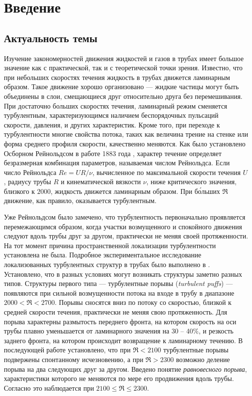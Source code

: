 \chapter{Введение}

\section{Актуальность темы} 

Изучение закономерностей движения жидкостей и газов в трубах имеет большое значение как с практической, так и с теоретической точки зрения. Известно, что при небольших скоростях течения жидкость в трубах движется ламинарным образом. Такое движение хорошо организовано --- жидкие частицы могут быть объединены в слои, смещающиеся друг относительно друга без перемешивания. При достаточно больших скоростях течения, ламинарный режим сменяется турбулентным, характеризующимся наличием беспорядочных пульсаций скорости, давления, и других характеристик. Кроме того, при переходе к турбулентности многие свойства потока, таких как величина трение на стенке или форма среднего профиля скорости, качественно меняются. Как было установлено Осборном Рейнольдсом в работе 1883 года \cite{Reynolds1883}, характер течение определяет безразмерная комбинация параметров, называемая числом Рейнольдса. Если число Рейнольдса $Re=UR/\nu$, вычисленное по максимальной скорости течения $U$, радиусу трубы $R$ и кинематической вязкости $\nu$, ниже критического значения, близкого к $2000$, жидкость движется ламинарным образом. При б\'{о}льших $\Re$ движение, как правило, оказывается турбулентным.

Уже Рейнольдсом было замечено, что турбулентность первоначально проявляется перемежающимся образом, когда участки возмущенного и спокойного движения следуют вдоль трубы друг за другом, практически не меняя своей протяженности. На тот момент причина пространственной локализации турбулентности установлена не была. Подробное экспериментальное исследование локализованных турбулентных структур в трубах было выполнено в \cite{Wygnanski1973}. Установлено, что в разных условиях могут возникать структуры заметно разных типов. Структуры первого типа --- турбулентные порывы ({\it turbulent puffs}) --- появляются при сильной возмущенности потока на входе в трубу в диапазоне $2000<\Re<2700$. Порывы сносятся вниз по потоку со скоростью, близкой к средней скорости течения, практически не меняя свою протяженность. Для порыва характерны размытость переднего фронта, на котором скорость на оси трубы плавно уменьшается от ламинарного значения на 30 -- 40\%, и резкость заднего фронта, на котором происходит возвращение к ламинарному течению. В последующей работе \cite{Wygnanski1975} установлено, что при $\Re<2100$ турбулентные порывы подвержены спонтанному исчезновению, а при $\Re>2300$ возможно деление порыва на два следующих друг за другом. Введено понятие {\it равновесного порыва}, характеристики которого не меняются по мере его продвижения вдоль трубы. Согласно \cite{Wygnanski1975} это наблюдается при $2100\leqslant\Re\leqslant2300$. 

